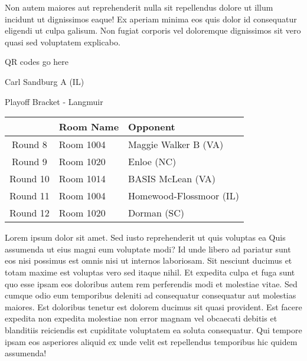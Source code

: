 \documentclass{article}%
\begin{document}
\newline%
Non autem maiores aut reprehenderit nulla sit repellendus dolore ut illum incidunt ut dignissimos eaque! Ex aperiam minima eos quis dolor id consequatur eligendi ut culpa galisum. Non fugiat corporis vel doloremque dignissimos sit vero quasi sed voluptatem explicabo.\newline%
\newline%
%
\vspace*{30pt}%
\begin{center}%
\begin{Huge}%
QR codes go here%
\end{Huge}%
\end{center}%
\newpage%
\begin{center}%
\begin{Huge}%
Carl Sandburg A (IL)%
\end{Huge}%
\vspace*{8pt}%
\linebreak%
\begin{Large}%
Playoff Bracket {-} Langmuir%
\end{Large}%
\end{center}%
\begin{tabularx}{\textwidth}{|c|Y|Y|}%
\hline%
&Room Name&Opponent\\%
\hline%
Round 8&Room 1004&Maggie Walker B (VA)\\%
Round 9&Room 1020&Enloe (NC)\\%
Round 10&Room 1014&BASIS McLean (VA)\\%
Round 11&Room 1004&Homewood{-}Flossmoor (IL)\\%
Round 12&Room 1020&Dorman (SC)\\%
\hline%
\end{tabularx}%
\vspace*{8pt}%
\linebreak%
\newline%
\newline%
Lorem ipsum dolor sit amet. Sed iusto reprehenderit ut quis voluptas ea Quis assumenda ut eius magni eum voluptate modi? Id unde libero ad pariatur sunt eos nisi possimus est omnis nisi ut internos laboriosam. Sit nesciunt ducimus et totam maxime est voluptas vero sed itaque nihil. Et expedita culpa et fuga sunt quo esse ipsam eos doloribus autem rem perferendis modi et molestiae vitae.\newline%
\newline%
Sed cumque odio eum temporibus deleniti ad consequatur consequatur aut molestias maiores. Est doloribus tenetur est dolorem ducimus sit quasi provident. Est facere expedita non expedita molestiae non error magnam vel obcaecati debitis et blanditiis reiciendis est cupiditate voluptatem ea soluta consequatur. Qui tempore ipsam eos asperiores aliquid ex unde velit est repellendus temporibus hic quidem assumenda!\newline%
\end{document}
